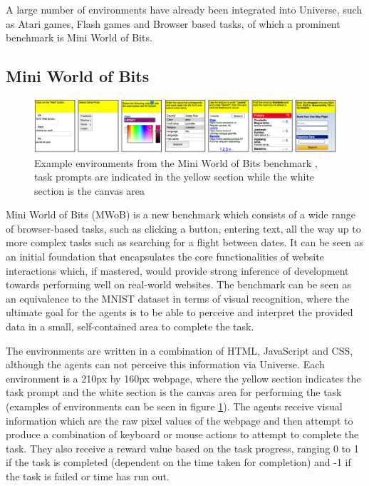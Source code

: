 \documentclass[conference]{IEEEtran}
\begin{document}
A large number of environments have already been integrated into Universe, such as Atari games, Flash games and Browser based tasks, of which a prominent benchmark is Mini World of Bits.

\subsection{Mini World of Bits}

\begin{figure}[t]
	\includegraphics[width=\textwidth, height=\textheight, keepaspectratio]{mwob.png}
	\caption{Example environments from the Mini World of Bits benchmark \cite{mwob}, task prompts are indicated in the yellow section while the white section is the canvas area}
	\label{fig:mwob}
\end{figure}

Mini World of Bits (MWoB) \cite{mwob} is a new benchmark which consists of a wide range of browser-based tasks, such as clicking a button, entering text, all the way up to more complex tasks such as searching for a flight between dates. It can be seen as an initial foundation that encapsulates the core functionalities of website interactions which, if mastered, would provide strong inference of development towards performing well on real-world websites. The benchmark can be seen as an equivalence to the MNIST dataset \cite{lecun1998gradient} in terms of visual recognition, where the ultimate goal for the agents is to be able to perceive and interpret the provided data in a small, self-contained area to complete the task.

The environments are written in a combination of HTML, JavaScript and CSS, although the agents can not perceive this information via Universe. Each environment is a 210px by 160px webpage, where the yellow section indicates the task prompt and the white section is the canvas area for performing the task (examples of environments can be seen in figure \ref{fig:mwob}). The agents receive visual information which are the raw pixel values of the webpage and then attempt to produce a combination of keyboard or mouse actions to attempt to complete the task. They also receive a reward value based on the task progress, ranging 0 to 1 if the task is completed (dependent on the time taken for completion) and -1 if the task is failed or time has run out.
\end{document}
